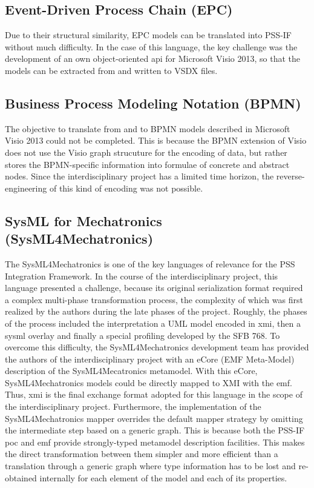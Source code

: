 \subsection{Event-Driven Process Chain (EPC)}

Due to their structural similarity, EPC models can be translated into PSS-IF without much difficulty. In the case of this language, the key challenge was the development of an own object-oriented \gls{api} for Microsoft Visio 2013, so that the models can be extracted from and written to VSDX files.

\subsection{Business Process Modeling Notation (BPMN)}

The objective to translate from and to BPMN models described in Microsoft Visio 2013 could not be completed. This is because the BPMN extension of Visio does not use the Visio graph strucuture for the encoding of data, but rather stores the BPMN-specific information into formulae of concrete and abstract nodes. Since the interdisciplinary project has a limited time horizon, the reverse-engineering of this kind of encoding was not possible. 

\subsection{SysML for Mechatronics (SysML4Mechatronics)}

The SysML4Mechatronics is one of the key languages of relevance for the PSS Integration Framework. In the course of the interdisciplinary project, this language presented a challenge, because its original serialization format required a complex multi-phase transformation process, the complexity of which was first realized by the authors during the late phases of the project. Roughly, the phases of the process included the interpretation a UML model encoded in \gls{xmi}, then a \gls{sysml} overlay and finally a special profiling developed by the SFB 768. To overcome this difficulty, the SysML4Mechatronics development team has provided the authors of the interdisciplinary project with an eCore (EMF Meta-Model) description of the SysML4Mecatronics metamodel. With this eCore, SysML4Mechatronics models could be directly mapped to XMI with the \gls{emf}. Thus, \gls{xmi} is the final exchange format adopted for this language in the scope of the interdisciplinary project. Furthermore, the implementation of the SysML4Mechatronics mapper overrides the default mapper strategy by omitting the intermediate step based on a generic graph. This is because both the PSS-IF \gls{poc} and \gls{emf} provide strongly-typed metamodel description facilities. This makes the direct transformation between them simpler and more efficient than a translation through a generic graph where type information has to be lost and re-obtained internally for each element of the model and each of its properties.

